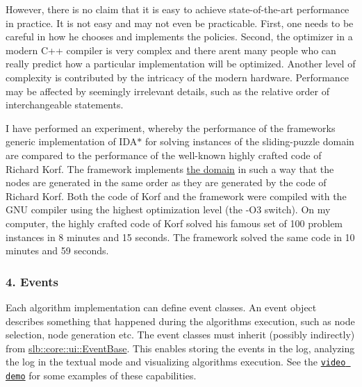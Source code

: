 However, there is no claim that it is easy to achieve state-\/of-\/the-\/art performance in practice. It is not easy and may not even be practicable. First, one needs to be careful in how he chooses and implements the policies. Second, the optimizer in a modern C++ compiler is very complex and there aren\textquotesingle{}t many people who can really predict how a particular implementation will be optimized. Another level of complexity is contributed by the intricacy of the modern hardware. Performance may be affected by seemingly irrelevant details, such as the relative order of interchangeable statements.

I have performed an experiment, whereby the performance of the framework\textquotesingle{}s generic implementation of I\+D\+A$\ast$ for solving instances of the sliding-\/puzzle domain are compared to the performance of the well-\/known highly crafted code of Richard Korf. The framework implements \hyperlink{structslb_1_1ext_1_1domain_1_1sliding__tile_1_1SlidingTile}{the domain} in such a way that the nodes are generated in the same order as they are generated by the code of Richard Korf. Both the code of Korf and the framework were compiled with the G\+NU compiler using the highest optimization level (the {\ttfamily -\/\+O3} switch). On my computer, the highly crafted code of Korf solved his famous set of 100 problem instances in 8 minutes and 15 seconds. The framework solved the same code in 10 minutes and 59 seconds.\hypertarget{index_s-events}{}\subsubsection{4. Events}\label{index_s-events}
Each algorithm implementation can define event classes. An event object describes something that happened during the algorithm\textquotesingle{}s execution, such as node selection, node generation etc. The event classes must inherit (possibly indirectly) from \hyperlink{structslb_1_1core_1_1ui_1_1EventBase}{slb\+::core\+::ui\+::\+Event\+Base}. This enables storing the events in the log, analyzing the log in the textual mode and visualizing algorithm\textquotesingle{}s execution. See the \href{https://youtu.be/cElxLWve1Zw}{\tt video demo} for some examples of these capabilities.

